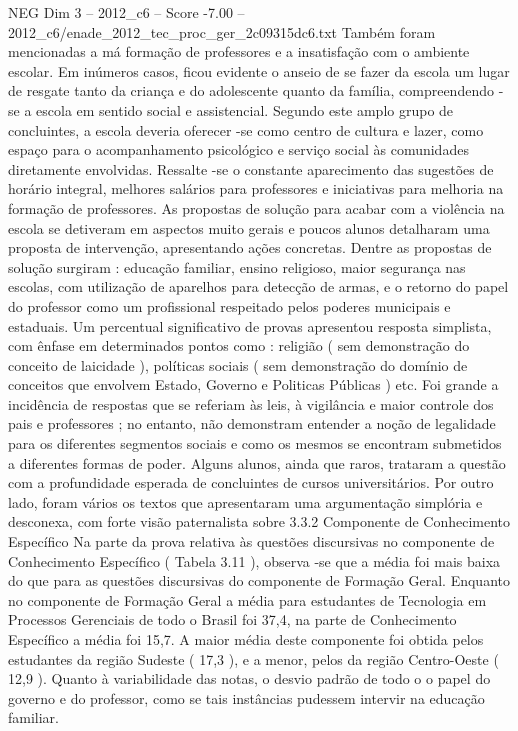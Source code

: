 \begin{textsample}{NEG Dim 3 – 2012\_c6 – Score -7.00 – 2012\_c6/enade\_2012\_tec\_proc\_ger\_2c09315dc6.txt}
Também foram mencionadas a má formação de professores e a insatisfação com o ambiente escolar.
Em inúmeros casos, ficou evidente o anseio de se fazer da escola um lugar de resgate tanto da criança e do adolescente quanto da família, compreendendo -se a escola em sentido social e assistencial.
Segundo este amplo grupo de concluintes, a escola deveria oferecer -se como centro de cultura e lazer, como espaço para o acompanhamento psicológico e serviço social às comunidades diretamente envolvidas.
Ressalte -se o constante aparecimento das sugestões de horário integral, melhores salários para professores e iniciativas para melhoria na formação de professores.
As propostas de solução para acabar com a violência na escola se detiveram em aspectos muito gerais e poucos alunos detalharam uma proposta de intervenção, apresentando ações concretas.
Dentre as propostas de solução surgiram : educação familiar, ensino religioso, maior segurança nas escolas, com utilização de aparelhos para detecção de armas, e o retorno do papel do professor como um profissional respeitado pelos poderes municipais e estaduais.
Um percentual significativo de provas apresentou resposta simplista, com ênfase em determinados pontos como : religião ( sem demonstração do conceito de laicidade ), políticas sociais ( sem demonstração do domínio de conceitos que envolvem Estado, Governo e Politicas Públicas ) etc.
Foi grande a incidência de respostas que se referiam às leis, à vigilância e maior controle dos pais e professores ; no entanto, não demonstram entender a noção de legalidade para os diferentes segmentos sociais e como os mesmos se encontram submetidos a diferentes formas de poder.
Alguns alunos, ainda que raros, trataram a questão com a profundidade esperada de concluintes de cursos universitários.
Por outro lado, foram vários os textos que apresentaram uma argumentação simplória e desconexa, com forte visão paternalista sobre 3.3.2 Componente de Conhecimento Específico Na parte da prova relativa às questões discursivas no componente de Conhecimento Específico ( Tabela 3.11 ), observa -se que a média foi mais baixa do que para as questões discursivas do componente de Formação Geral.
Enquanto no componente de Formação Geral a média para estudantes de Tecnologia em Processos Gerenciais de todo o Brasil foi 37,4, na parte de Conhecimento Específico a média foi 15,7.
A maior média deste componente foi obtida pelos estudantes da região Sudeste ( 17,3 ), e a menor, pelos da região Centro-Oeste ( 12,9 ).
Quanto à variabilidade das notas, o desvio padrão de todo o o papel do governo e do professor, como se tais instâncias pudessem intervir na educação familiar.

\end{textsample}
